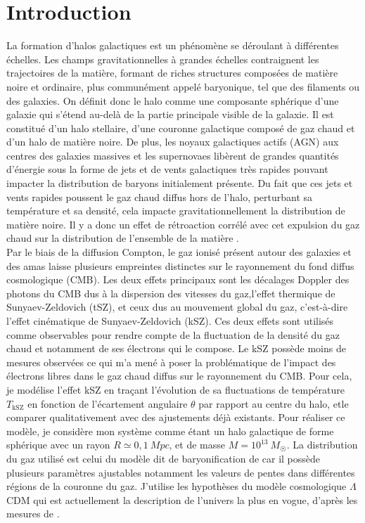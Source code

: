 \documentclass[a4paper, french, twoside, twocolumn, 11 pt]{article}
\begin{document}
\section{Introduction}
La formation d'halos galactiques est un phénomène se déroulant à différentes échelles. Les champs gravitationnelles à grandes échelles contraignent les trajectoires de la matière, formant de riches structures composées de matière noire et ordinaire, plus communément appelé baryonique, tel que des filaments ou des galaxies. On définit donc le halo comme une composante sphérique d'une galaxie qui s'étend au-delà de la partie principale visible de la galaxie. Il est constitué d'un halo stellaire, d'une couronne galactique composé de gaz chaud et d'un halo de matière noire. De plus, les noyaux galactiques actifs (AGN) aux centres des galaxies massives et les supernovaes libèrent de grandes quantités d'énergie sous la forme de jets et de vents galactiques très rapides pouvant impacter la distribution de baryons initialement présente. Du fait que ces jets et vents rapides poussent le gaz chaud diffus hors de l'halo, perturbant sa température et sa densité, cela impacte gravitationnellement la distribution de matière noire. Il y a donc un effet de rétroaction corrélé avec cet expulsion du gaz chaud sur la distribution de l'ensemble de la matière \cite{pandey2024godmaxmodelinggasthermodynamics}.\\
Par le biais de la diffusion Compton, le gaz ionisé présent autour des galaxies et des amas laisse plusieurs empreintes distinctes sur le rayonnement du fond diffus cosmologique (CMB). Les deux effets principaux sont les décalages Doppler des photons du CMB dus à la dispersion des vitesses du gaz,l'effet thermique de Sunyaev-Zeldovich (tSZ), et ceux dus au mouvement global du gaz, c'est-à-dire l'effet cinématique de Sunyaev-Zeldovich (kSZ).
Ces deux effets sont utilisés comme observables \cite{Birkinshaw_1986} pour rendre compte de la fluctuation de la densité du gaz chaud et notamment de ses électrons qui le compose. Le kSZ possède moins de mesures observées ce qui m'a mené à poser la problématique de l'impact des électrons libres dans le gaz chaud diffus sur le rayonnement du CMB. Pour cela, je modélise l'effet kSZ en traçant l'évolution de sa fluctuations de température $T_\text{kSZ}$ en fonction de l'écartement angulaire $\theta$ par rapport au centre du halo, etle comparer qualitativement avec des ajustements déjà existants. Pour réaliser ce modèle, je considère mon système comme étant un halo galactique de forme sphérique avec un rayon $R\simeq0,1\ \unit{Mpc}$, et de masse $M=10^{13}\ \unit{M_\Sun}$. La distribution du gaz utilisé est celui du modèle dit de baryonification de \cite{schneider2025baryonificationalternativehydrodynamicalsimulations} car il possède plusieurs paramètres ajustables notamment les valeurs de pentes dans différentes régions de la couronne du gaz. J'utilise les hypothèses du modèle cosmologique $\Lambda$CDM qui est actuellement la description de l'univers la plus en vogue, d'après les mesures de \cite{Planck_2020}. 
\end{document}
